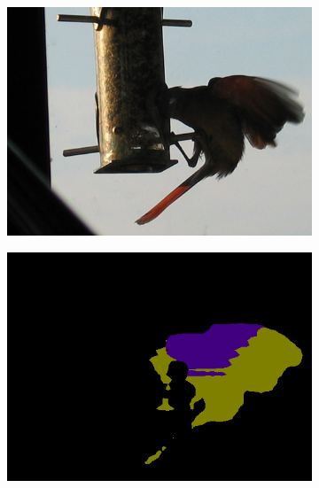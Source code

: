\documentclass{article} %
\begin{document}
\begin{figure}[t]
\begin{subfigure}[b]{0.19\linewidth}
  \end{subfigure}

  \begin{subfigure}[b]{0.19\linewidth}
    \includegraphics[width=\textwidth]{figs/ab/img/2008_007498}
  \end{subfigure}
  \begin{subfigure}[b]{0.19\linewidth}
    \includegraphics[width=\textwidth]{figs/ab/step8/2008_007498}
  \end{subfigure}
  \begin{subfigure}[b]{0.19\linewidth}

\end{subfigure}
\end{figure}
\end{document}
